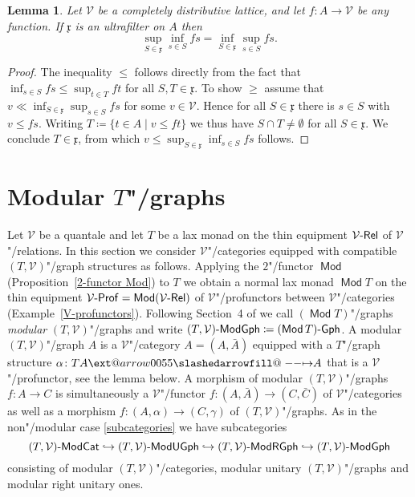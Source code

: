 \documentclass[preprint, a4paper]{elsarticle}
\makeatletter
\def\slashedarrowfill@#1#2#3#4#5{%
  $\m@th\thickmuskip0mu\medmuskip\thickmuskip\thinmuskip\thickmuskip
   \relax#5#1\mkern-7mu%
   \cleaders\hbox{$#5\mkern-2mu#2\mkern-2mu$}\hfill
   \mathclap{#3}\mathclap{#2}%
   \cleaders\hbox{$#5\mkern-2mu#2\mkern-2mu$}\hfill
   \mkern-7mu#4$%
}
\def\rightslashedarrowfill@{%
  \slashedarrowfill@\relbar\relbar\mapstochar\rightarrow}
\newcommand\xslashedrightarrow[2][]{%
  \ext@arrow 0055{\rightslashedarrowfill@}{#1}{#2}}
\def\slashedrightarrow{\xslashedrightarrow{}}
\newtheorem{lemma}[theorem]{Lemma}
\theoremstyle{definition}
\theoremstyle{remark}
\providecommand{\exref}[1]{Example~\ref{#1}}
\providecommand{\propref}[1]{Proposition~\ref{#1}}
\providecommand{\dfn}{\coloneqq}
\providecommand{\into}{\hookrightarrow}
\providecommand{\mf}[1]{\mathfrak{#1}}
\providecommand{\brcs}[1]{\lbrace #1 \rbrace}
\providecommand{\set}[1]{\brcs{#1}}
\providecommand{\isect}{\cap}
\providecommand{\map}[3]{#1\colon#2\to#3}
\providecommand{\hmap}[3]{#1\colon#2\slashedrightarrow#3}
\providecommand{\catvar}[1]{\mathcal{#1}}
\providecommand{\2}{\mathsf 2}
\providecommand{\V}{\catvar V}
\providecommand{\Rel}{\mathsf{Rel}}
\providecommand{\enRel}[1]{#1\text-\Rel}
\DeclareMathOperator{\Mod}{\mathsf{Mod}}
\providecommand{\Prof}{\mathsf{Prof}}
\providecommand{\enProf}[1]{#1\text-\Prof}
\providecommand{\ModCat}[1]{#1\text-\mathsf{ModCat}}
\providecommand{\Gph}[1]{#1\text-\mathsf{Gph}}
\providecommand{\ModGph}[1]{#1\text-\mathsf{ModGph}}
\providecommand{\ModRGph}[1]{#1\text-\mathsf{ModRGph}}
\providecommand{\ModUGph}[1]{#1\text-\mathsf{ModUGph}}
\makeatother
\begin{document}
	\begin{lemma} \label{minimax}
		Let $\V$ be a completely distributive lattice, and let $\map fA\V$ be any function. If $\mf x$ is an ultrafilter on $A$ then
		\begin{displaymath}
			\sup_{S \in \mf x} \inf_{s \in S} fs = \inf_{S \in \mf x} \sup_{s \in S} fs.
		\end{displaymath}
	\end{lemma}
	\begin{proof}
		The inequality $\leq$ follows directly from the fact that $\inf_{s \in S} fs \leq \sup_{t \in T} ft$ for all $S, T \in \mf x$. To show $\geq$ assume that $v \ll \inf_{S \in \mf x} \sup_{s \in S} fs$ for some $v \in \V$. Hence for all $S \in \mf x$ there is $s \in S$ with $v \leq fs$. Writing $T \dfn \set{t \in A \mid v \leq ft}$ we thus have $S \isect T \neq \emptyset$ for all $S \in \mf x$. We conclude $T \in \mf x$, from which $v \leq \sup_{S \in \mf x} \inf_{s \in S} fs$ follows.
	\end{proof}

	\section{Modular \texorpdfstring{$T$}{T}"/graphs} \label{modular T-graphs}
	Let $\V$ be a quantale and let $T$ be a lax monad on the thin equipment $\enRel\V$ of $\V$"/relations. In this section we consider $\V$"/categories equipped with compatible $(T, \V)$"/graph structures as follows. Applying the $2$"/functor $\Mod$ (\propref{2-functor Mod}) to $T$ we obtain a normal lax monad $\Mod T$ on the thin equipment $\enProf\V = \Mod(\enRel\V)$ of $\V$"/profunctors between $\V$"/categories (\exref{V-profunctors}). Following Section~4 of \cite{Tholen09} we call $(\Mod T)$"/graphs \emph{modular} $(T,\V)$"/graphs and write $\ModGph{(T, \V)} \dfn \Gph{(\Mod T)}$. A modular $(T, \V)$"/graph $A$ is a $\V$"/category $A = (A, \bar A)$ equipped with a $T$"/graph structure $\hmap\alpha{TA}A$ that is a $\V$"/profunctor, see the lemma below. A morphism of modular $(T, \V)$"/graphs $\map fAC$ is simultaneously a $\V$"/functor $\map f{(A, \bar A)}{(C, \bar C)}$ of $\V$"/categories as well as a morphism $\map f{(A, \alpha)}{(C, \gamma)}$ of $(T, \V)$"/graphs. As in the non"/modular case \eqref{subcategories} we have subcategories
	\begin{displaymath}
		\ModCat{(T, \V)} \into \ModUGph{(T, \V)} \into \ModRGph{(T, \V)} \into \ModGph{(T, \V)}
	\end{displaymath}
	consisting of modular $(T, \V)$"/categories, modular unitary $(T, \V)$"/graphs and modular right unitary ones.
  
\end{document}
